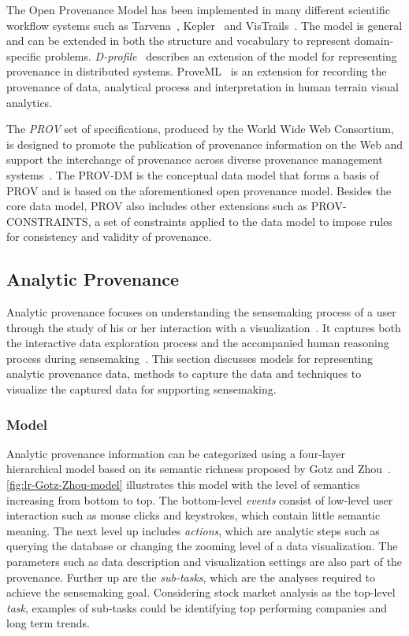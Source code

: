 The Open Provenance Model has been implemented in many different scientific workflow systems such as Tarvena~\cite{Zhao2008}, Kepler~\cite{Bowers2006} and VisTrails~\cite{Bavoil2005}. The model is general and can be extended in both the structure and vocabulary to represent domain-specific problems. \emph{D-profile}~\cite{Groth2011} describes an extension of the model for representing provenance in distributed systems. ProveML~\cite{Walker2013} is an extension for recording the provenance of data, analytical process and interpretation in human terrain visual analytics.

The \emph{PROV} set of specifications, produced by the World Wide Web Consortium, is designed to promote the publication of provenance information on the Web and support the interchange of provenance across diverse provenance management systems~\cite{Missier2013}. The PROV-DM is the conceptual data model that forms a basis of PROV and is based on the aforementioned open provenance model. Besides the core data model, PROV also includes other extensions such as PROV-CONSTRAINTS, a set of constraints applied to the data model to impose rules for consistency and validity of provenance.

\subsection{Analytic Provenance}
\label{sec:lr-analytic-provenance}
Analytic provenance focuses on understanding the sensemaking process of a user through the study of his or her interaction with a visualization~\cite{North2011}. It captures both the interactive data exploration process and the accompanied human reasoning process during sensemaking~\cite{Xu2015}. This section discusses models for representing analytic provenance data, methods to capture the data and techniques to visualize the captured data for supporting sensemaking.

\subsubsection{Model}
\label{sec:lr-analytic-provenance-model}
Analytic provenance information can be categorized using a four-layer hierarchical model based on its semantic richness proposed by Gotz and Zhou~\cite{Gotz2009}. \autoref{fig:lr-Gotz-Zhou-model} illustrates this model with the level of semantics increasing from bottom to top. The bottom-level \emph{events} consist of low-level user interaction such as mouse clicks and keystrokes, which contain little semantic meaning. The next level up includes \emph{actions}, which are analytic steps such as querying the database or changing the zooming level of a data visualization. The parameters such as data description and visualization settings are also part of the provenance. Further up are the \emph{sub-tasks}, which are the analyses required to achieve the sensemaking goal. Considering stock market analysis as the top-level \emph{task}, examples of sub-tasks could be identifying top performing companies and long term trends. 

